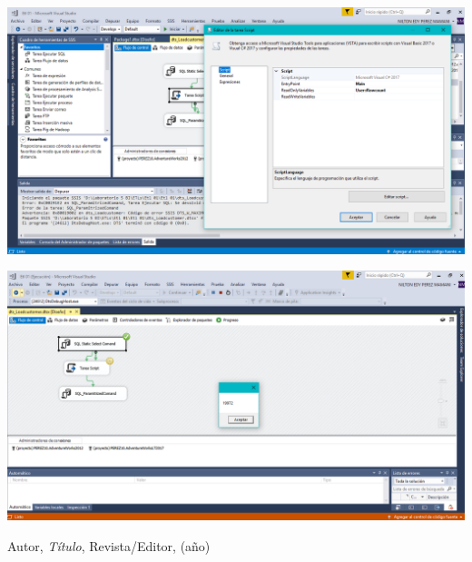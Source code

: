 {\begin{center}
\end{center}
\begin{center}
\includegraphics[width=15cm]{./Imagenes/imagen26}
\end{center}
\begin{center}
\includegraphics[width=15cm]{./Imagenes/imagen27}
\end{center}
}



\begin{thebibliography}{99}

 Autor, \emph{Título}, Revista/Editor, (año)

\end{thebibliography}


